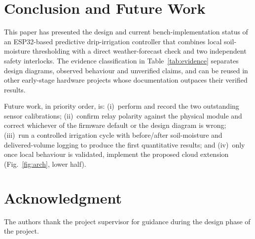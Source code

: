 \documentclass[conference]{IEEEtran}
\begin{document}
\section{Conclusion and Future Work}
\label{sec:conclusion}

This paper has presented the design and current bench-implementation
status of an ESP32-based predictive drip-irrigation controller that
combines local soil-moisture thresholding with a direct weather-forecast
check and two independent safety interlocks. The evidence classification
in Table~\ref{tab:evidence} separates design diagrams, observed behaviour
and unverified claims, and can be reused in other early-stage hardware
projects whose documentation outpaces their verified results.

Future work, in priority order, is: (i)~perform and record the two
outstanding sensor calibrations; (ii)~confirm relay polarity against
the physical module and correct whichever of the firmware default or
the design diagram is wrong; (iii)~run a controlled irrigation cycle
with before/after soil-moisture and delivered-volume logging to produce
the first quantitative results; and (iv)~only once
local behaviour is validated, implement the proposed cloud extension
(Fig.~\ref{fig:arch}, lower half).

\section*{Acknowledgment}
The authors thank the project supervisor for guidance during the design
phase of the project.
\end{document}
